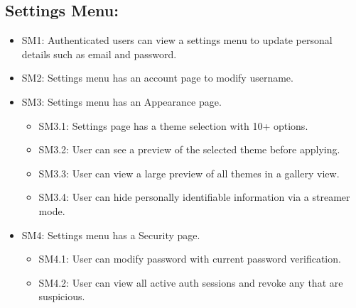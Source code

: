 \subsection{Settings Menu:}
\begin{itemize}
    \item\label{req:SM1} SM1: Authenticated users can view a settings menu to update personal details such as email and password.
    \item\label{req:SM2} SM2: Settings menu has an account page to modify username.
    \item\label{req:SM3} SM3: Settings menu has an Appearance page.
    \begin{itemize}
        \item\label{req:SM3.1} SM3.1: Settings page has a theme selection with 10+ options.
        \item\label{req:SM3.2} SM3.2: User can see a preview of the selected theme before applying.
        \item\label{req:SM3.3} SM3.3: User can view a large preview of all themes in a gallery view.
        \item\label{req:SM3.4} SM3.4: User can hide personally identifiable information via a streamer mode.
    \end{itemize}
    \item\label{req:SM4} SM4: Settings menu has a Security page.
    \begin{itemize}
        \item\label{req:SM4.1} SM4.1: User can modify password with current password verification.
        \item\label{req:SM4.2} SM4.2: User can view all active auth sessions and revoke any that are suspicious.
    \end{itemize}
\end{itemize}


